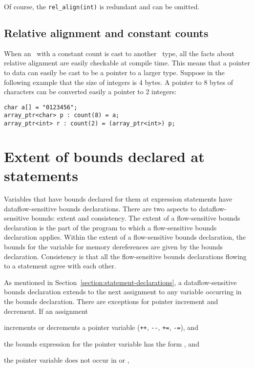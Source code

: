 Of course, the \texttt{rel\_align(int)} is redundant and can be omitted.

\subsection{Relative alignment and constant counts}

When an \arrayptr\ with a constant count is cast to another
\arrayptr\ type, all the facts about relative alignment are
easily checkable at compile time. This means that a pointer to data can
easily be cast to be a pointer to a larger type. Suppose in the
following example that the size of integers is 4 bytes. A pointer to 8
bytes of characters can be converted easily a pointer to 2 integers:

\begin{verbatim}
char a[] = "0123456";
array_ptr<char> p : count(8) = a;
array_ptr<int> r : count(2) = (array_ptr<int>) p;
\end{verbatim}

\section{Extent of bounds declared at statements}
\label{section:extent-of-declarations}

Variables that have bounds declared for them at expression statements
have dataflow-sensitive bounds declarations. There are two aspects to
dataflow-sensitive bounds: extent and consistency. The extent of a
flow-sensitive bounds declaration is the part of the program to which 
a flow-sensitive bounds
declaration applies. Within the extent of a flow-sensitive 
bounds declaration, the
bounds for the variable for memory dereferences are given by the bounds
declaration. Consistency is that all the flow-sensitive bounds 
declarations flowing to a statement agree with each other.

As mentioned in Section~\ref{section:statement-declarations},
a dataflow-sensitive bounds declaration
extends to the next assignment to any variable occurring in the bounds
declaration. There are exceptions for pointer increment and decrement.
If an assignment

\begin{compactitem}
\item
  increments or decrements a pointer variable (\texttt{++},
  \texttt{-\/-}, \texttt{+=}, \texttt{-=}), and
\item
  the bounds expression for the pointer variable has the form
  , and
\item
  the pointer variable does not occur in  or ,
\end{compactitem}

